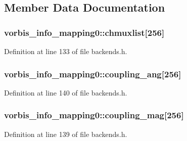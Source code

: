 \subsection{Member Data Documentation}
\subsubsection[{\texorpdfstring{chmuxlist}{chmuxlist}}]{ vorbis\+\_\+info\+\_\+mapping0\+::chmuxlist\mbox{[}256\mbox{]}}\hypertarget{structvorbis__info__mapping0_a65301b0ac70965455f29baf01503f959}{}\label{structvorbis__info__mapping0_a65301b0ac70965455f29baf01503f959}


Definition at line 133 of file backends.\+h.

\subsubsection[{\texorpdfstring{coupling\+\_\+ang}{coupling_ang}}]{ vorbis\+\_\+info\+\_\+mapping0\+::coupling\+\_\+ang\mbox{[}256\mbox{]}}\hypertarget{structvorbis__info__mapping0_a9a145ee5d8f00b7255461b262fb4e886}{}\label{structvorbis__info__mapping0_a9a145ee5d8f00b7255461b262fb4e886}


Definition at line 140 of file backends.\+h.

\subsubsection[{\texorpdfstring{coupling\+\_\+mag}{coupling_mag}}]{ vorbis\+\_\+info\+\_\+mapping0\+::coupling\+\_\+mag\mbox{[}256\mbox{]}}\hypertarget{structvorbis__info__mapping0_aae668f0f09c4f101de4899e8a1310c8b}{}\label{structvorbis__info__mapping0_aae668f0f09c4f101de4899e8a1310c8b}


Definition at line 139 of file backends.\+h.

